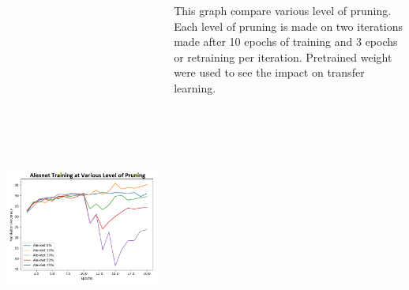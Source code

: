 \documentclass[25pt, a0paper,
               colspace=15mm, subcolspace=0mm,
               blockverticalspace=17mm,
               landscape]{tikzposter} %
\begin{document}
\begin{columns}
{\begin{center}
	\includegraphics[width=25cm, height=15cm]{figures/prune_ratio}
\end{center}

This graph compare various level of pruning. Each level of pruning is made on two iterations made after 10 epochs of training and 3 epochs or retraining per iteration. Pretrained weight were used to see the impact on transfer learning.
}

\end{columns}
\end{document}
